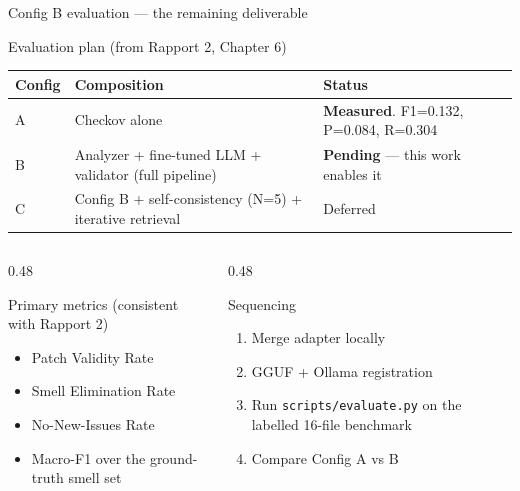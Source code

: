 \documentclass[aspectratio=169, 10pt]{beamer}
\begin{document}
\begin{frame}{Config B evaluation --- the remaining deliverable}
  \begin{block}{Evaluation plan (from Rapport 2, Chapter 6)}
    \scriptsize
    \begin{tabular}{lll}
      \toprule
      \textbf{Config} & \textbf{Composition} & \textbf{Status} \\
      \midrule
      A & Checkov alone                                              & \textbf{Measured}. F1=0.132, P=0.084, R=0.304 \\
      \rowcolor{sfaxgold!15}
      B & Analyzer + fine-tuned LLM + validator (full pipeline)      & \textbf{Pending} --- this work enables it \\
      C & Config B + self-consistency (N=5) + iterative retrieval    & Deferred \\
      \bottomrule
    \end{tabular}
  \end{block}
  \begin{columns}[T]
    \begin{column}{0.48\textwidth}
      \begin{exampleblock}{Primary metrics (consistent with Rapport 2)}
        \scriptsize
        \begin{itemize}
          \item Patch Validity Rate
          \item Smell Elimination Rate
          \item No-New-Issues Rate
          \item Macro-F1 over the ground-truth smell set
        \end{itemize}
      \end{exampleblock}
    \end{column}
    \begin{column}{0.48\textwidth}
      \begin{alertblock}{Sequencing}
        \scriptsize
        \begin{enumerate}
          \item Merge adapter locally
          \item GGUF + Ollama registration
          \item Run \texttt{scripts/evaluate.py}
                on the labelled 16-file benchmark
          \item Compare Config A vs B
        \end{enumerate}
      \end{alertblock}
    \end{column}
  \end{columns}
\end{frame}
\end{document}
